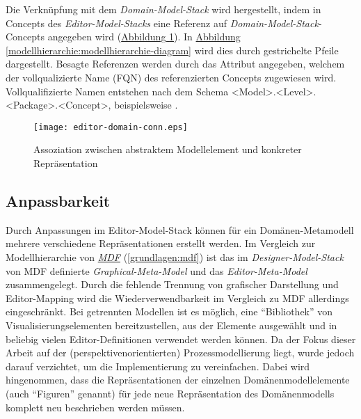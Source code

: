 \documentclass[a4paper,10pt]{sphinxmanual}
\begin{document}
Die Verknüpfung mit dem \emph{Domain-Model-Stack} wird hergestellt, indem in Concepts des \emph{Editor-Model-Stacks} eine Referenz auf \emph{Domain-Model-Stack}-Concepts angegeben wird (\hyperref[modellhierarchie:editor-domain-conn]{Abbildung  \ref*{modellhierarchie:editor-domain-conn}}).
In \hyperref[modellhierarchie:modellhierarchie-diagram]{Abbildung  \ref*{modellhierarchie:modellhierarchie-diagram}} wird dies durch gestrichelte Pfeile dargestellt.
Besagte Referenzen werden durch das Attribut  angegeben, welchem der vollqualizierte Name (FQN) des referenzierten Concepts zugewiesen wird.
Vollqualifizierte Namen entstehen nach dem Schema \textless{}Model\textgreater{}.\textless{}Level\textgreater{}.\textless{}Package\textgreater{}.\textless{}Concept\textgreater{}, beispielsweise .
\begin{figure}[htbp]
\centering
\capstart

\texttt{[image: editor-domain-conn.eps]}
\caption{Assoziation zwischen abstraktem Modellelement und konkreter Repräsentation}\label{modellhierarchie:editor-domain-conn}\end{figure}


\subsection{Anpassbarkeit}
\label{modellhierarchie:anpassbarkeit}
Durch Anpassungen im Editor-Model-Stack können für ein Domänen-Metamodell mehrere verschiedene Repräsentationen erstellt werden.
Im Vergleich zur Modellhierarchie von {\hyperref[grundlagen:mdf]{\emph{MDF}}} (\autoref*{grundlagen:mdf}) ist das im \emph{Designer-Model-Stack} von MDF definierte \emph{Graphical-Meta-Model} und das \emph{Editor-Meta-Model} zusammengelegt.
Durch die fehlende Trennung von grafischer Darstellung und Editor-Mapping wird die Wiederverwendbarkeit im Vergleich zu MDF allerdings eingeschränkt.
Bei getrennten Modellen ist es möglich, eine "`Bibliothek"' von Visualisierungselementen bereitzustellen, aus der Elemente ausgewählt und in beliebig vielen Editor-Definitionen verwendet werden können.
Da der Fokus dieser Arbeit auf der (perspektivenorientierten) Prozessmodellierung liegt, wurde jedoch darauf verzichtet, um die Implementierung zu vereinfachen.
Dabei wird hingenommen, dass die Repräsentationen der einzelnen Domänenmodellelemente (auch "`Figuren"' genannt) für jede neue Repräsentation des Domänenmodells komplett neu beschrieben werden müssen.
\end{document}
